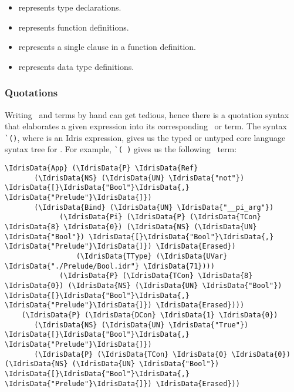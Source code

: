 \begin{itemize}
\item{} represents type declarations.
\item{} represents function definitions.
\item{} represents a single clause in a function definition.
\item{} represents data type definitions.
\end{itemize}

\subsubsection{Quotations}

Writing \TT\ and  terms by hand can get tedious, hence there is a
quotation syntax that elaborates a given expression into its corresponding
\TT\ or  term.\cite{idrisQuotation}
The syntax \texttt{\`{}()}, where  is an Idris expression, gives
us the typed or untyped core language syntax tree for . For example,
\texttt{\`{}( )} gives us the following \TT\ term:
\begin{Verbatim}[framesep=2mm, label=\footnotesize{\normalfont{Idris}}, labelposition=topline]
\IdrisData{App} (\IdrisData{P} \IdrisData{Ref}
       (\IdrisData{NS} (\IdrisData{UN} \IdrisData{"not"}) \IdrisData{[}\IdrisData{"Bool"}\IdrisData{,} \IdrisData{"Prelude"}\IdrisData{]})
       (\IdrisData{Bind} (\IdrisData{UN} \IdrisData{"__pi_arg"})
             (\IdrisData{Pi} (\IdrisData{P} (\IdrisData{TCon} \IdrisData{8} \IdrisData{0}) (\IdrisData{NS} (\IdrisData{UN} \IdrisData{"Bool"}) \IdrisData{[}\IdrisData{"Bool"}\IdrisData{,} \IdrisData{"Prelude"}\IdrisData{]}) \IdrisData{Erased})
                 (\IdrisData{TType} (\IdrisData{UVar} \IdrisData{"./Prelude/Bool.idr"} \IdrisData{71})))
             (\IdrisData{P} (\IdrisData{TCon} \IdrisData{8} \IdrisData{0}) (\IdrisData{NS} (\IdrisData{UN} \IdrisData{"Bool"}) \IdrisData{[}\IdrisData{"Bool"}\IdrisData{,} \IdrisData{"Prelude"}\IdrisData{]}) \IdrisData{Erased})))
    (\IdrisData{P} (\IdrisData{DCon} \IdrisData{1} \IdrisData{0})
       (\IdrisData{NS} (\IdrisData{UN} \IdrisData{"True"}) \IdrisData{[}\IdrisData{"Bool"}\IdrisData{,} \IdrisData{"Prelude"}\IdrisData{]})
       (\IdrisData{P} (\IdrisData{TCon} \IdrisData{0} \IdrisData{0}) (\IdrisData{NS} (\IdrisData{UN} \IdrisData{"Bool"}) \IdrisData{[}\IdrisData{"Bool"}\IdrisData{,} \IdrisData{"Prelude"}\IdrisData{]}) \IdrisData{Erased}))
\end{Verbatim}

